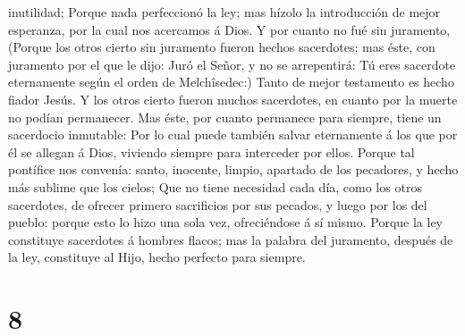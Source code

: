 inutilidad;  Porque nada perfeccionó la ley; mas hízolo
la introducción de mejor esperanza, por la cual nos acercamos á Dios.
 Y por cuanto no fué sin juramento, 
(Porque los otros cierto sin juramento fueron hechos sacerdotes; mas
éste, con juramento por el que le dijo: Juró el Señor, y no se
arrepentirá: Tú eres sacerdote eternamente según el orden de
Melchîsedec:)  Tanto de mejor testamento es hecho fiador
Jesús.  Y los otros cierto fueron muchos sacerdotes, en
cuanto por la muerte no podían permanecer.  Mas éste, por
cuanto permanece para siempre, tiene un sacerdocio inmutable:
 Por lo cual puede también salvar eternamente á los que
por él se allegan á Dios, viviendo siempre para interceder por ellos.
 Porque tal pontífice nos convenía: santo, inocente,
limpio, apartado de los pecadores, y hecho más sublime que los cielos;
 Que no tiene necesidad cada día, como los otros
sacerdotes, de ofrecer primero sacrificios por sus pecados, y luego por
los del pueblo: porque esto lo hizo una sola vez, ofreciéndose á sí
mismo.  Porque la ley constituye sacerdotes á hombres
flacos; mas la palabra del juramento, después de la ley, constituye al
Hijo, hecho perfecto para siempre.

\hypertarget{section-7}{%
\section{8}\label{section-7}}

